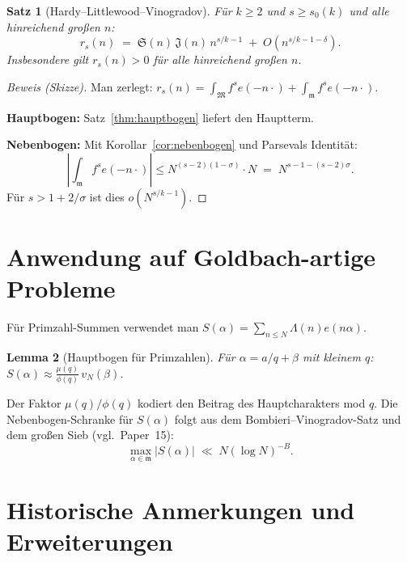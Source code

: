 \documentclass[12pt,a4paper]{amsart}
\newtheorem{theorem}{Satz}[section]
\newtheorem{lemma}[theorem]{Lemma}
\theoremstyle{definition}
\newcommand{\eq}[1]{e\!\left(#1\right)}
\begin{document}
\begin{theorem}[Hardy--Littlewood--Vinogradov]\label{thm:haupt}
  Für $k \geq 2$ und $s \geq s_0(k)$ und alle hinreichend großen $n$:
  \[
    r_s(n) \;=\; \mathfrak{S}(n)\, \mathfrak{J}(n)\, n^{s/k - 1}
                 \;+\; O\!\left(n^{s/k - 1 - \delta}\right).
  \]
  Insbesondere gilt $r_s(n) > 0$ für alle hinreichend großen $n$.
\end{theorem}

\begin{proof}[Beweis (Skizze)]
  Man zerlegt:
  $r_s(n) = \int_{\mathfrak{M}} f^s \eq{-n\cdot} + \int_{\mathfrak{m}} f^s \eq{-n\cdot}$.

  \textbf{Hauptbogen:} Satz~\ref{thm:hauptbogen} liefert den Hauptterm.

  \textbf{Nebenbogen:} Mit Korollar~\ref{cor:nebenbogen} und Parsevals Identität:
  \[
    \left|\int_{\mathfrak{m}} f^s \eq{-n\cdot}\right|
    \leq N^{(s-2)(1-\sigma)} \cdot N \;=\; N^{s-1-(s-2)\sigma}.
  \]
  Für $s > 1 + 2/\sigma$ ist dies $o(N^{s/k - 1})$.
\end{proof}

\section{Anwendung auf Goldbach-artige Probleme}
\label{sec:goldbach}

Für Primzahl-Summen verwendet man
$S(\alpha) = \sum_{n \leq N} \Lambda(n) \eq{n\alpha}$.

\begin{lemma}[Hauptbogen für Primzahlen]\label{lem:hauptbogen_primes}
  Für $\alpha = a/q + \beta$ mit kleinem $q$:
  $S(\alpha) \approx \frac{\mu(q)}{\phi(q)}\, v_N(\beta)$.
\end{lemma}

Der Faktor $\mu(q)/\phi(q)$ kodiert den Beitrag des Hauptcharakters mod $q$.
Die Nebenbogen-Schranke für $S(\alpha)$ folgt aus dem Bombieri--Vinogradov-Satz
und dem großen Sieb (vgl.\ Paper~15):
\[
  \max_{\alpha \in \mathfrak{m}} |S(\alpha)| \;\ll\; N(\log N)^{-B}.
\]

\section{Historische Anmerkungen und Erweiterungen}
\label{sec:hist}
\end{document}

